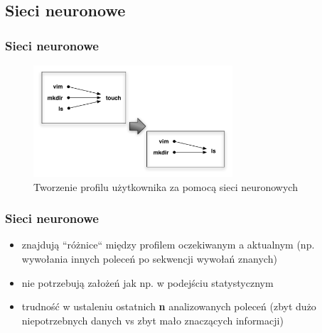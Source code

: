 \documentclass{beamer}
\begin{document}
\subsection{Sieci neuronowe}
\begin{frame}
  \frametitle{Sieci neuronowe}
    \begin{figure}
      \includegraphics[width=20em]{neural_net.pdf}
      \caption{Tworzenie profilu użytkownika za pomocą sieci neuronowych}
    \end{figure}
\end{frame}
\begin{frame}
  \frametitle{Sieci neuronowe}
  \begin{itemize}
    \item znajdują ``różnice`` między profilem oczekiwanym a aktualnym (np.
        wywołania innych poleceń po sekwencji wywołań znanych)
    \item nie potrzebują założeń jak np. w podejściu statystycznym
    \item trudność w ustaleniu ostatnich \textbf{n} analizowanych poleceń
        (zbyt dużo niepotrzebnych danych vs zbyt mało znaczących informacji)
  \end{itemize}
\end{frame}
\end{document}
